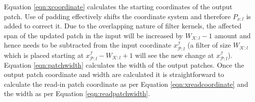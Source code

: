 Equation \ref{eqn:xcoordinate} calculates the starting coordinates of the output patch.
Use of padding effectively shifts the coordinate system and therefore $P_{x:l}$ is added to correct it.
Due to the overlapping nature of filter kernels, the affected span of the updated patch in the input will be increased by $W_{\mathcal{K}:l}-1$ amount and hence needs to be subtracted from the input coordinate $x^\mathcal{I}_{\mathcal{P}:l}$ (a filter of size $W_{\mathcal{K}:l}$ which is placed starting at $x^\mathcal{I}_{\mathcal{P}:l} - W_{\mathcal{K}:l} + 1$ will see the new change at $x^\mathcal{I}_{\mathcal{P}:l}$).
Equation \ref{eqn:patchwidth} calculates the width of the output patches.
Once the output patch coordinate and width are calculated it is straightforward to calculate the read-in patch coordinate as per Equation \ref{eqn:xreadcoordinate} and the width as per Equation \ref{eqn:readpatchwidth}.


\begin{table}[t]
  \centering
  \caption{Additional symbols used in the Section \ref{sec:optimizer} and Section \ref{sec:approx}}
\label{table:optimizer_symbols}
\end{table}

